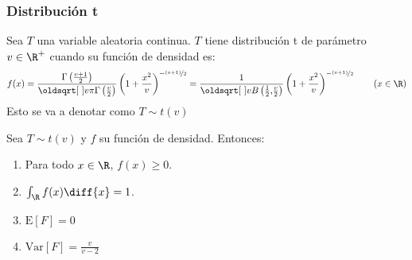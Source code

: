 \subsubsection{Distribución t}
\begin{Def}
    Sea $T$ una variable aleatoria continua. $T$ tiene distribución t
    de parámetro $v \in \R^+$ cuando su función de densidad es:
    \[
        f(x)=\frac{\Gamma\left(\frac{v+1}{2}\right)}
        {\sqrt{v\pi}\Gamma\left(\frac{v}{2}\right)}
        \left(1+\frac{x^2}{v}\right)^{-\nicefrac{(v+1)}{2}}
        =
        \frac{1}{\sqrt{v}B\left(\frac{1}{2}\text{,}\frac{v}{2}\right)}
        \left(1+\frac{x^2}{v}\right)^{-\nicefrac{(v+1)}{2}}
        \qquad (x \in \R)
    \]
    Esto se va a denotar como $T\sim t(v)$
\end{Def}
\begin{Teo}
    Sea $T\sim t(v)$ y $f$ su función de densidad. Entonces:
    \begin{enumerate}
        \item Para todo $x\in\R$, $f(x) \geq 0$.
        \item $\int_{\R}f(x)\diff{x}=1$.
        \item $\text{E}[F]=0$
        \item $\text{Var}[F]=\frac{v}{v-2}$
    \end{enumerate}
\end{Teo}
